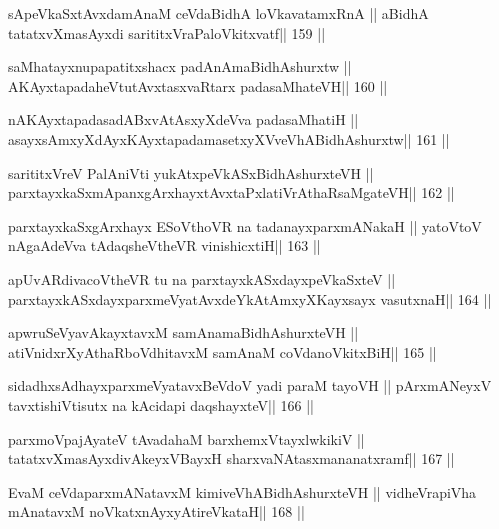 \begin{shl}
sApeVkaSxtAvxdamAnaM ceVdaBidhA loVkavatamxRnA ||
aBidhA tatatxvXmasAyxdi sarititxVraPaloVkitxvatf\hfill || 159 ||
\end{shl}

\begin{shl}
saMhatayxnupapatitxshacx padAnAmaBidhAshurxtw ||
AKAyxtapadaheVtutAvxtasxvaRtarx padasaMhateVH\hfill || 160 ||
\end{shl}

\begin{shl}
nA\s\s KAyxtapadasadABxvAtAsxyXdeVva padasaMhatiH ||
asayxsAmxyXdAyxKAyxtapadamasetxyXVveVhABidhAshurxtw\hfill || 161 ||
\end{shl}

\begin{shl}
sarititxVreV PalAniVti yukAtx\s peVkASx\s BidhAshurxteVH ||
parxtayxkaSxmApanxgArxhayxtAvxtaPxlatiVrAthaRsaMgateVH\hfill || 162 ||
\end{shl}

\begin{shl}
parxtayxkaSxgArxhayx ESoV\s thoVR na tadanayxparxmANakaH ||
yatoV\s toV nA\s\s gaAdeVva tAdaqsheV\s theVR vinishicxtiH\hfill || 163 ||
\end{shl}

\begin{shl}
apUvARdivacoV\s theVR tu na parxtayxkASxdayxpeVkaSxteV ||
parxtayxkASxdayxparxmeVyatAvxdeYkAtAmxyXKayxsayx vasutxnaH\hfill || 164 ||
\end{shl}

\begin{shl}
apwruSeVyavAkayxtavxM samAnamaBidhAshurxteVH ||
atiVnidxrXyAthaRboVdhitavxM samAnaM coVdanoVkitxBiH\hfill || 165 ||
\end{shl}

\begin{shl}
sidadhxsAdhayxparxmeVyatavxBeVdoV yadi paraM tayoVH ||
pArxmANeyxV tavxtishiVtisutx na kAcidapi daqshayxteV\hfill || 166 ||
\end{shl}

\begin{shl}
parxmoVpajAyateV tAvadahaM barxhemxVtayxlwkikiV ||
tatatxvXmasAyxdivAkeyxVBayxH sharxvaNAtasxmananatxramf\hfill || 167 ||
\end{shl}

\begin{shl}
EvaM ceVdaparxmANatavxM kimiveVhABidhAshurxteVH ||
vidheVrapiVha mAnatavxM noVkatxnAyxyAtireVkataH\hfill || 168 ||
\end{shl}


